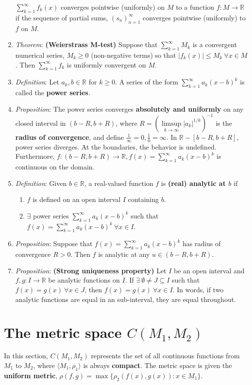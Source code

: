 \documentclass[10pt]{article}
\newcommand{\seqn}[1]{(#1)^\infty_{n=1}}
\newcommand{\infsrsk}[1]{\sum\limits^\infty_{k=1}#1}
\newcommand{\real}{\mathbb{R}}
\newcommand{\cmm}{C(M_1,M_2)}
\newcommand{\met}[1]{\langle M_{#1},\rho_{#1}\rangle}
\begin{document}
\begin{multicols*}{3}
\begin{enumerate}
			$\infsrsk{f_{k}(x)}$ converges pointwise (uniformly) on $M$ to a function
			$f:M\to\real$ if the sequence of partial sums, $\seqn{s_{n}}$ converges
			pointwise (uniformly) to $f$ on $M$.
		\item \emph{Theorem}: \textbf{(Weierstrass M-test)} Suppose that
			$\infsrsk{M_{k}}$ is a convergent numerical series, $M_{k}\geq 0$
			(non-negative terms) so that $|f_{k}(x)|\leq M_{k}\ \forall x\in M$. Then
			$\infsrsk{f_{k}}$ is uniformly convergent on $M$.
		\item \emph{Definition}: Let $a_{k},b\in\real$ for $k\geq 0$. A series of
		the form $\infsrsk{a_{k}(x-b)^{k}}$ is called the \textbf{power series}.
		\item \emph{Proposition}: The power series converges \textbf{absolutely and
			uniformly} on any closed interval in $(b-R,b+R)$, where
			$R=(\limsup\limits_{k\to\infty}|a_{k}|^{1/k})^{-1}$ is the \textbf{radius
			of convergence}, and define $\frac{1}{\infty}=0, \frac{1}{0}=\infty$. In
			$\real-[b-R,b+R]$, power series diverges. At the boundaries, the behavior
			is undefined. Furthermore, $f:(b-R,b+R)\to\real,f(x)=\infsrsk{a_{k}(x-b)^{k}}$ is
			continuous on the domain.
			\item \emph{Definition}: Given $b\in\real$, a real-valued function
			$f$ is \textbf{(real) analytic at $b$} if
			\begin{enumerate}
				\item $f$ is defined on an open interval $I$ containing $b$.
				\item $\exists$ power series $\infsrsk{a_{k}(x-b)^{k}}$ such that
				$f(x)=\infsrsk{a_k}(x-b)^{k}\ \forall x\in I$.
			\end{enumerate}
			\item \emph{Proposition}: Suppose that $f(x)=\infsrsk{a_{k}(x-b)^{k}}$ has
			radius of convergence $R>0$. Then $f$ is analytic at any $u\in(b-R,b+R)$.
			\item \emph{Proposition}: \textbf{(Strong uniqueness property)} Let $I$ be
			an open interval and $f,g:I\to\real$ be analytic functions on $I$. If
			$\exists\ \emptyset\neq J\subseteq I$ such that $f(x)=g(x)\ \forall x\in J$,
			then $f(x)=g(x)\ \forall x\in I$. In words, if two analytic functions are
			equal in an sub-interval, they are equal throughout.
	\end{enumerate}

	\section{The metric space $\cmm$}
	In this section, $C(M_{1},M_{2})$ represents the set of all continuous
	functions from $M_{1}$ to $M_{2}$, where $\met{1}$ is always \textbf{compact}.
	The metric space is given the \textbf{uniform metric},
	$\rho(f,g)=\max\{\rho_{2}(f(x),g(x)):x\in M_{1}\}$.


\end{multicols*}
\end{document}
